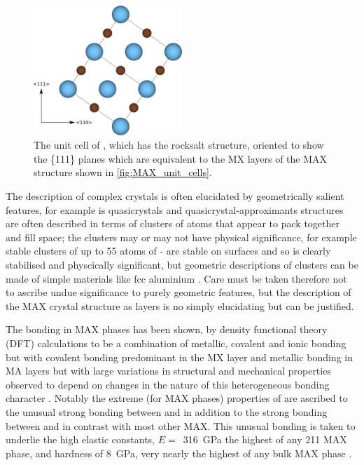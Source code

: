 \begin{figure}
\centering
\includegraphics[width=0.5\textwidth]{TiC_111}
\caption{The unit cell of , which has the rocksalt structure, oriented to show the \{111\} planes which are equivalent to the MX layers of the MAX structure shown in \ref{fig:MAX_unit_cells}. \label{fig:TiC_111}}
\end{figure}


The description of complex crystals is often elucidated by geometrically salient features, for example is quasicrystals and quasicrystal-approximants structures are often described in terms of clusters of atoms that appear to pack together and fill space; the clusters may or may not have physical significance, for example stable clusters of up to 55 atoms of - are stable on surfaces and so is clearly stabilised and physcically significant, but geometric descriptions of clusters can be made of simple materials like fcc aluminium \cite{Steurer2006}. Care must be taken therefore not to ascribe undue significance to purely geometric features, but the description of the MAX crystal structure as layers is no simply elucidating but can be justified.

The bonding in MAX phases has been shown, by density functional theory (DFT) calculations to be a combination of metallic, covalent and ionic bonding but with covalent bonding predominant in the MX layer and metallic bonding in MA layers but with large variations in structural and mechanical properties observed to depend on changes in the nature of this heterogeneous bonding character \cite{Radovic2013,Sun2011}. Notably the extreme (for MAX phases) properties of  are ascribed to the unusual strong bonding between  and  in addition to the strong bonding between  and  in contrast with most other MAX. This unusual bonding is taken to underlie the high elastic constants, $E =$~\SI{316}{\giga\pascal} the highest of any 211 MAX phase, and hardness of \SI{8}{\giga\pascal}, very nearly the highest of any bulk MAX phase \cite{Feng2010,Sun2011}.

